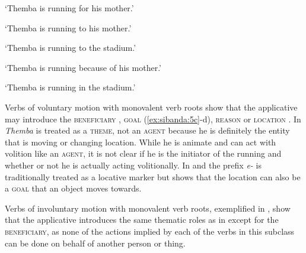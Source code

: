 \documentclass[output=paper]{langsci/langscibook}
\begin{document}
\glt ‘Themba is running for his mother.’ 


\glt ‘Themba is running to his mother.’


\glt ‘Themba is running to the stadium.’


\glt ‘Themba is running because of his mother.’


\glt ‘Themba is running in the stadium.’
\z
\z

Verbs of voluntary motion with monovalent verb roots show that the applicative may introduce the \textsc{beneficiary} , \textsc{goal} (\ref{ex:sibanda:5c}-d), \textsc{reason}  or \textsc{location} . In  \textit{Themba} is treated as a \textsc{theme}, not an \textsc{agent} because he is definitely the entity that is moving or changing location. While he is animate and can act with volition like an \textsc{agent,} it is not clear if he is the initiator of the running and whether or not he is actually acting volitionally. In  and  the prefix \textit{e-} is traditionally treated as a locative marker but  shows that the location can also be a \textsc{goal} that an object moves towards.

 Verbs of involuntary motion with monovalent verb roots, exemplified in , show that the applicative introduces the same thematic roles as in  except for the \textsc{beneficiary,} as none of the actions implied by each of the verbs in this subclass can be done on behalf of another person or thing.
\end{document}
